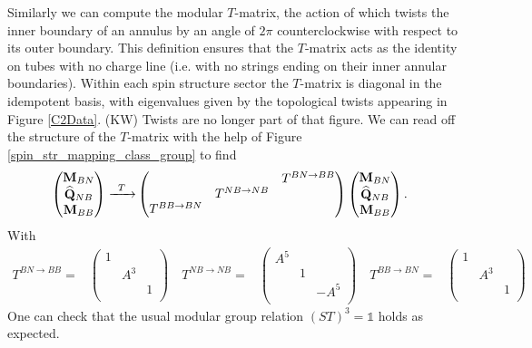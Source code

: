 \documentclass[12pt,a4paper]{article}
\newcounter{arrow}
\newcommand{\unit}{\mathds{1}}
\newcommand{\kw}[1]{{\color{kwcolor}\footnotesize{(KW) #1}}}
\begin{document}
Similarly we can compute the modular $T$-matrix, the action of which twists the inner boundary of an annulus by an angle of $2\pi$ counterclockwise with respect to its outer boundary. 
This definition ensures that the $T$-matrix acts as the identity on tubes with no charge line 
(i.e. with no strings ending on their inner annular boundaries).
Within each spin structure sector the $T$-matrix is diagonal in the idempotent basis, 
with eigenvalues given by the topological twists appearing in Figure \ref{C2Data}. 
\kw{Twists are no longer part of that figure.}
We can read off the structure of the $T$-matrix with the help of Figure \ref{spin_str_mapping_class_group} to find
\begin{align}
\left( \begin{matrix}
{\bf M}_{BN}\\
\widehat{{\bf Q} }_{NB}\\
{\bf M}_{BB}\\
\end{matrix} \right)
\xrightarrow{\;\; T \; \; } & \left( \begin{matrix}
&&T^{BN \rightarrow BB}\\
&T^{NB \rightarrow NB}&\\
T^{BB \rightarrow BN}&&\\
\end{matrix} \right)
\left( \begin{matrix}
{\bf M}_{BN}\\
\widehat{{\bf Q} }_{NB}\\
{\bf M}_{BB}\\
\end{matrix} \right).
\end{align}
With 
\begin{align}
T^{BN \rightarrow BB} =  & \left( \begin{matrix}
1&&\\
&A^3&\\
&&1\\
\end{matrix} \right)
\quad 
T^{NB \rightarrow NB}=  & \left( \begin{matrix}
A^5&&\\
&1&\\
&&-A^5\\
\end{matrix} \right)
\quad 
T^{BB \rightarrow BN}=  & \left( \begin{matrix}
1&&\\
&A^3&\\
&&1\\
\end{matrix} \right)
\end{align}
One can check that the usual modular group relation $(ST)^3 = \unit$ holds as expected. 
\end{document}
